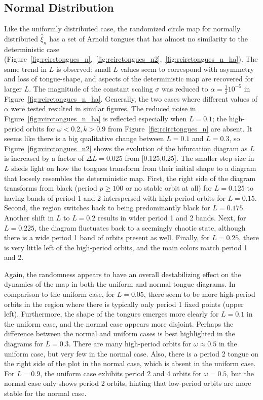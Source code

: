 \subsection{Normal Distribution}
Like the uniformly distributed case, the randomized circle map for
normally distributed $\hat{\xi}_n$ has a set of Arnold tongues that
has almost no similarity to the deterministic case (Figure~\ref{fig:rcirctongues_n},~\ref{fig:rcirctongues_n2},~\ref{fig:rcirctongues_n_ha}). The same trend in $L$ is observed: small $L$ values seem to correspond
with asymmetry and loss of tongue-shape, and aspects of the
deterministic map are recovered for larger $L$. The magnitude of the
constant scaling $\sigma$ was reduced to $\alpha = \frac{1}{2}10^{-5}$
in Figure~\ref{fig:rcirctongues_n_ha}. Generally, the two cases where
different values of $\alpha$ were tested resulted in similar figures. The reduced noise in Figure~\ref{fig:rcirctongues_n_ha}
is reflected especially when $L=0.1$; the high-period orbits for
$\omega < 0.2, k > 0.9$ from Figure~\ref{fig:rcirctongues_n} are
absent. It seems like there is a big qualitative change between
$L=0.1$ and $L=0.3$, so Figure~\ref{fig:rcirctongues_n2} shows the
evolution of the bifurcation diagram as $L$ is increased by a factor
of $\Delta L=0.025$ from [0.125,0.25]. The smaller step size in $L$
sheds light on how the tongues transform from their initial shape to a
diagram that loosely resembles the deterministic map. First, the right
side of the diagram transforms from black (period $p \geq 100$ or no stable
orbit at all) for $L=0.125$ to having bands of period 1 and 2 interspersed with
high-period orbits for $L=0.15$. Second, the region switches back to
being predominantly black for $L=0.175$. Another shift in $L$ to
$L=0.2$ results in wider period 1 and 2 bands. Next, for $L=0.225$,
the diagram fluctuates back to a seemingly chaotic state, although
there is a wide period 1 band of orbits present as well. Finally, for
$L=0.25$, there is very little left of the high-period orbits, and the
main colors match period 1 and 2. 

Again, the randomness appears to have an overall destabilizing effect on the dynamics of the
map in both the uniform and normal tongue diagrams. In comparison to the uniform case, for $L=0.05$, there seem to be
more high-period orbits in the region where there is typically only
period 1 fixed points (upper left). Furthermore, the shape of the
tongues emerges more clearly for $L=0.1$ in the uniform case, and the
normal case appears more disjoint. Perhaps the difference between the
normal and uniform cases is best highlighted in the diagrams for
$L=0.3$. There are many high-period orbits for $\omega \approx 0.5$ in
the uniform case, but very few in the normal case. Also, there is a period
2 tongue on the right side of the plot in the normal case, which is
absent in the uniform case. For $L=0.9$, the uniform case exhibits period 2 and 4 orbits
for $\omega=0.5$, but the normal case only shows period 2 orbits, hinting that low-period orbits are more stable for the normal case. 

